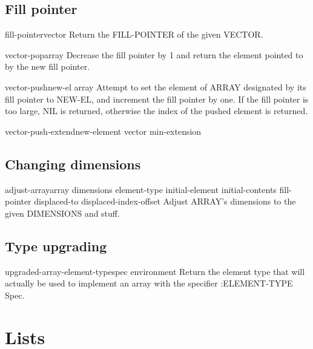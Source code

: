 \documentclass[10pt,english]{book}
\begin{document}
\section{Fill pointer}
\label{sec:fill-pointer}

\begin{accessor}{fill-pointer}{vector}
  Return the FILL-POINTER of the given VECTOR.
\end{accessor}

\begin{function}{vector-pop}{array}
  Decrease the fill pointer by 1 and return the element pointed to by the
  new fill pointer.
\end{function}

\begin{function}{vector-push}{new-el array}
  Attempt to set the element of ARRAY designated by its fill pointer
   to NEW-EL, and increment the fill pointer by one. If the fill pointer is
   too large, NIL is returned, otherwise the index of the pushed element is
   returned.
\end{function}

\begin{function}{vector-push-extend}{new-element vector \op min-extension}
  
\end{function}

\section{Changing dimensions}
\label{sec:changing-dimensions}

\begin{function}{adjust-array}{array dimensions \key element-type initial-element initial-contents
 fill-pointer displaced-to displaced-index-offset}
  Adjust ARRAY's dimensions to the given DIMENSIONS and stuff.
\end{function}

\section{Type upgrading}
\label{sec:type-upgrading}

\begin{function}{upgraded-array-element-type}{spec \op environment}
  Return the element type that will actually be used to implement an array
   with the specifier :ELEMENT-TYPE Spec.
\end{function}


\chapter{Lists}
\label{cha:lists}
\end{document}
